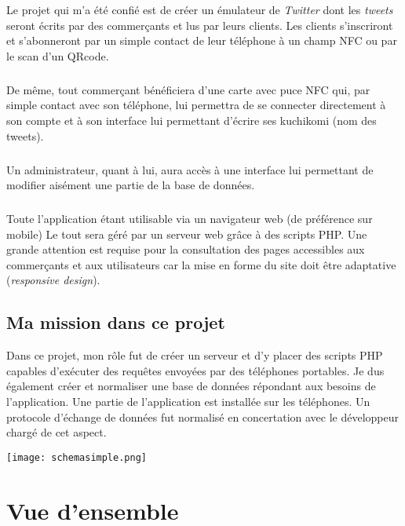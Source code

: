 \documentclass[a4paper,12pt,titlepage]{report}
\begin{document}
Le projet qui m'a été confié est de créer un émulateur de \emph{Twitter } dont les \emph{tweets} seront écrits par des commerçants et lus par leurs clients. Les clients s'inscriront et s'abonneront par un simple contact de leur téléphone à un champ NFC ou par le scan d'un QRcode.
\paragraph{}
De même, tout commerçant bénéficiera d'une carte avec puce NFC qui, par simple contact avec son téléphone, lui permettra de se connecter directement à son compte et à son interface lui permettant d'écrire ses \og kuchikomi \fg{}  (nom des tweets).
\paragraph{}
Un administrateur, quant à lui, aura accès à une interface lui permettant de modifier aisément une partie de la base de données.
\paragraph{}
Toute l'application étant utilisable via un navigateur web (de préférence sur mobile) Le tout sera géré par un serveur web grâce à des scripts PHP. Une grande attention est requise pour la consultation des pages accessibles aux commerçants et aux utilisateurs car la mise en forme du site doit être adaptative (\emph{responsive design}).

\newpage

\section{Ma mission dans ce projet}

Dans ce projet, mon rôle fut de créer un serveur et d'y placer des scripts PHP capables d'exécuter des requêtes envoyées par des téléphones portables. Je dus également créer et normaliser une base de données répondant aux besoins de l'application.
Une partie de l'application est installée sur les téléphones. Un protocole d'échange de données fut normalisé en concertation avec le développeur chargé de cet aspect.


\texttt{[image: schemasimple.png]}


\chapter{Vue d'ensemble}
\end{document}
